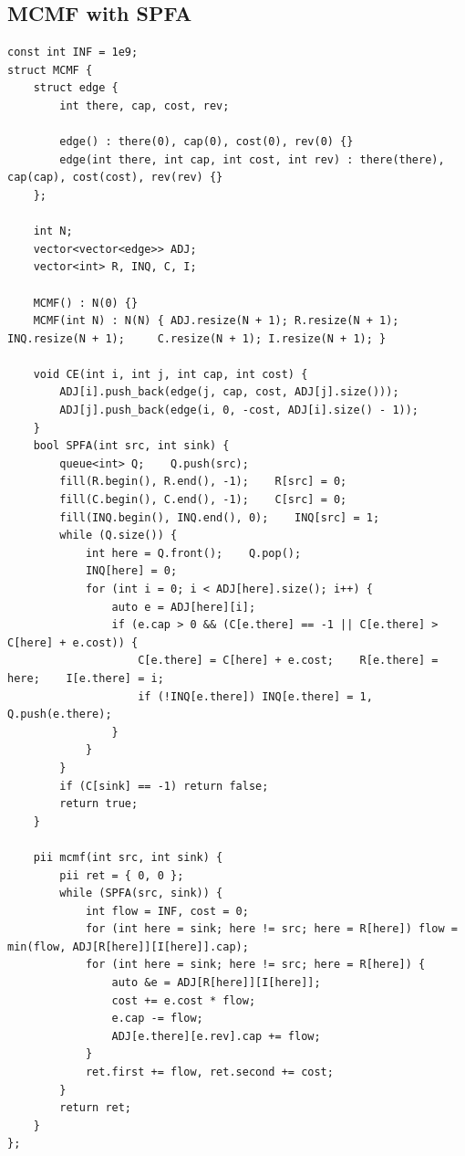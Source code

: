 \documentclass[landscape, 8pt, a4paper, oneside, twocolumn]{extarticle}
\begin{document}
\subsection{MCMF with SPFA}
\begin{verbatim}
const int INF = 1e9;
struct MCMF {
    struct edge {
        int there, cap, cost, rev;

        edge() : there(0), cap(0), cost(0), rev(0) {}
        edge(int there, int cap, int cost, int rev) : there(there), cap(cap), cost(cost), rev(rev) {}
    };

    int N;
    vector<vector<edge>> ADJ;
    vector<int> R, INQ, C, I;

    MCMF() : N(0) {}
    MCMF(int N) : N(N) { ADJ.resize(N + 1); R.resize(N + 1); INQ.resize(N + 1);     C.resize(N + 1); I.resize(N + 1); }

    void CE(int i, int j, int cap, int cost) {
        ADJ[i].push_back(edge(j, cap, cost, ADJ[j].size()));
        ADJ[j].push_back(edge(i, 0, -cost, ADJ[i].size() - 1));
    }
    bool SPFA(int src, int sink) {
        queue<int> Q;    Q.push(src);
        fill(R.begin(), R.end(), -1);    R[src] = 0;
        fill(C.begin(), C.end(), -1);    C[src] = 0;
        fill(INQ.begin(), INQ.end(), 0);    INQ[src] = 1;
        while (Q.size()) {
            int here = Q.front();    Q.pop();
            INQ[here] = 0;
            for (int i = 0; i < ADJ[here].size(); i++) {
                auto e = ADJ[here][i];
                if (e.cap > 0 && (C[e.there] == -1 || C[e.there] > C[here] + e.cost)) {
                    C[e.there] = C[here] + e.cost;    R[e.there] = here;    I[e.there] = i;
                    if (!INQ[e.there]) INQ[e.there] = 1, Q.push(e.there);
                }
            }
        }
        if (C[sink] == -1) return false;
        return true;
    }

    pii mcmf(int src, int sink) {
        pii ret = { 0, 0 };
        while (SPFA(src, sink)) {
            int flow = INF, cost = 0;
            for (int here = sink; here != src; here = R[here]) flow = min(flow, ADJ[R[here]][I[here]].cap);
            for (int here = sink; here != src; here = R[here]) {
                auto &e = ADJ[R[here]][I[here]];
                cost += e.cost * flow;
                e.cap -= flow;
                ADJ[e.there][e.rev].cap += flow;
            }
            ret.first += flow, ret.second += cost;
        }
        return ret;
    }
};
\end{verbatim}
\end{document}

